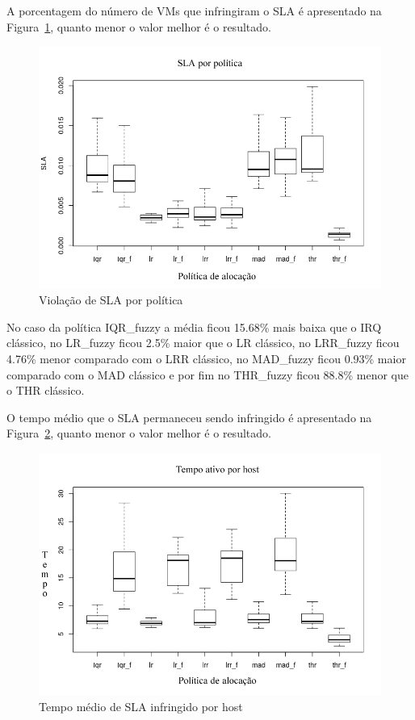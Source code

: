 \documentclass[tcc,capa]{texufpel}
\begin{document}
\newpage

A porcentagem do número de VMs que infringiram o SLA é apresentado na Figura~\ref{fig:sla_geral}, quanto menor o valor melhor é o resultado. 

\begin{figure}[h]
\centering
\includegraphics[scale=0.55]{images/resultados/geral_sla.png} %
\caption{Violação de SLA por política}
\label{fig:sla_geral}
\end{figure}

No caso da política IQR\_fuzzy a média ficou 15.68\% mais baixa que o IRQ clássico, no LR\_fuzzy ficou 2.5\% maior que o LR clássico, no  LRR\_fuzzy ficou 4.76\% menor comparado com o LRR clássico, no MAD\_fuzzy ficou 0.93\% maior comparado com o MAD clássico e por fim no THR\_fuzzy ficou 88.8\% menor que o THR clássico.

O tempo médio que o SLA permaneceu sendo infringido é apresentado na Figura~\ref{fig:sla_tempo_host_ativo}, quanto menor o valor melhor é o resultado.


\begin{figure}[h]
\centering
\includegraphics[scale=0.55]{images/resultados/sla_temp_por_host_ativo.png} %
\caption{Tempo médio de SLA infringido por host}
\label{fig:sla_tempo_host_ativo}
\end{figure}
\end{document}
